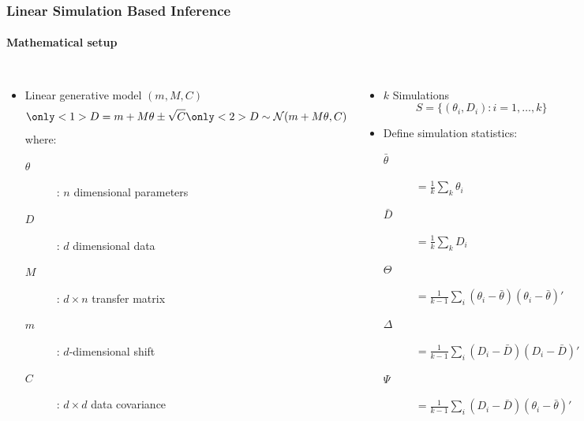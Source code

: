 \documentclass[aspectratio=169]{beamer}
\begin{document}
\begin{frame}
    \frametitle{Linear Simulation Based Inference}
    \framesubtitle{Mathematical setup}
    \begin{columns}[t]
        \begin{itemize}
            \item Linear generative model $(m,M,C)$
                \[ 
                    \only<1>{D = m + M \theta \pm \sqrt{C}}%
                    \only<2>{D \sim \mathcal{N}(m + M \theta, C)}
                \]%
                where:
                \begin{description}
                    \item[$\theta$]: $n$ dimensional parameters
                    \item[$D$]: $d$ dimensional data
                    \item[$M$]: $d\times n$ transfer matrix
                    \item[$m$]: $d$-dimensional shift
                    \item[$C$]:  $d\times d$ data covariance
                \end{description}
        \end{itemize}
        
        \begin{itemize}
            \item $k$ Simulations 
                \[
                    S=\{ (\theta_i,D_i): i=1,\ldots,k\}
                \]
            \item Define simulation statistics\footnotemark:

                \begin{description}
                    \item[$\bar\theta$] $= \tfrac{1}{k}\sum_k \theta_i$
                    \item[$\bar D$] $= \tfrac{1}{k}\sum_k D_i$
                    \item[$\Theta$] $=\tfrac{1}{k-1}\sum_i (\theta_i-\bar\theta)(\theta_i-\bar\theta)'$
                    \item[$\Delta$] $=\tfrac{1}{k-1}\sum_i (D_i-\bar D)(D_i-\bar D)'$
                    \item[$\Psi$] $=\tfrac{1}{k-1}\sum_i (D_i-\bar D)(\theta_i-\bar \theta)'$
                \end{description}
        \end{itemize}
    \end{columns}
\end{frame}
\end{document}
